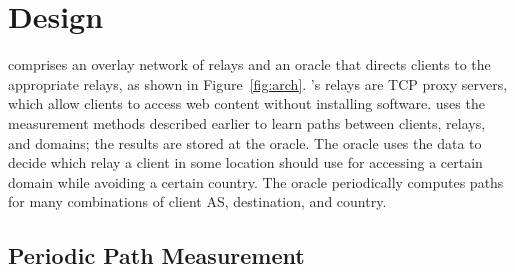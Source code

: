 \section{Design}
\label{system_design}

\system{} comprises an overlay network of relays and an oracle that
directs clients to the appropriate relays, as shown in
Figure~\ref{fig:arch}.  \system{}'s relays are TCP proxy servers,
which allow clients to access web content without installing software.
\system{} uses the
measurement methods described earlier to learn paths between
clients, relays, and domains; the results are stored at the
oracle.  The oracle uses the data to decide which relay a client in
some location should use for accessing a certain domain while avoiding
a certain country.  The oracle periodically computes paths for many
combinations of client AS, destination, and country.
%



\subsection{Periodic Path Measurement}


